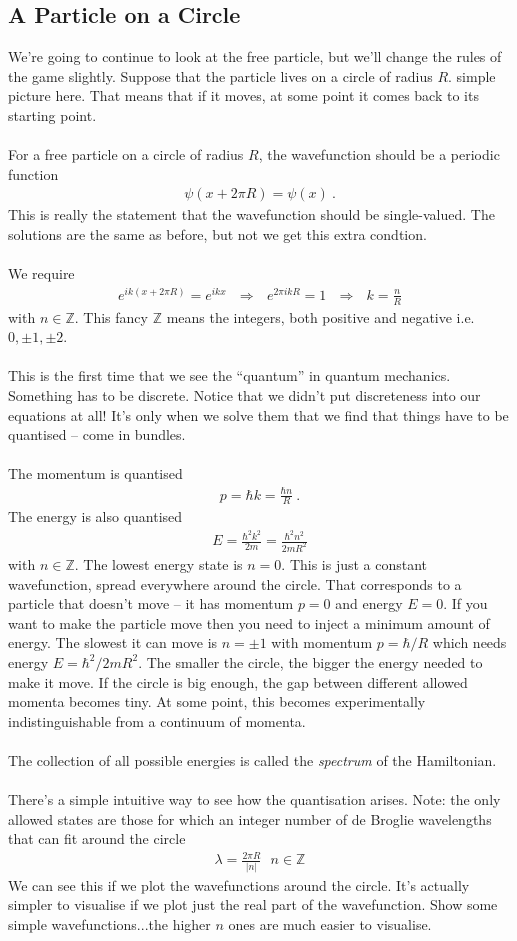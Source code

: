 \documentclass[12pt]{article}
\def\be{\begin{eqnarray}}
\def\ee{\end{eqnarray}}
\newcommand{\nn}{\nonumber}
\newcommand\para{\paragraph{}}
\newcommand{\Z}{{\mathds Z}}
\begin{document}
\subsection{A Particle on a Circle}

We're going to continue to look at the free particle, but we'll change the rules of the game slightly. Suppose that the particle lives on a circle of radius $R$. {\color{blue} simple picture here}. That means that if it moves, at some point it comes back to its starting point.  

\para
{\color{olive} For a free particle on a circle of radius $R$, the wavefunction should be a periodic function
%
\be \psi(x+ 2\pi R) = \psi(x)\ .\nn\ee
} 
This is really the statement that the wavefunction should be single-valued. The solutions are the same as before, but not we get this extra condtion.

\para
{\color{olive} We require 
%
\be e^{ik(x+2\pi R)} = e^{ikx} \ \ \ \Longrightarrow \ \ \ e^{2\pi ikR} = 1 \ \ \ \Longrightarrow \ \ \ k = \frac{n}{R} \nn\ee
%
with $n\in \Z$.} This fancy $\Z$ means the integers, both positive and negative i.e. $0,\pm 1,\pm 2$.

\para
This is the first time that we see the ``quantum'' in quantum mechanics. Something has to be discrete. Notice that we didn't put discreteness into our equations at all! It's only when we solve them that we find that things have to be quantised -- come in bundles. 

\para
{\color{olive} The momentum is quantised
%
\be p = \hbar k = \frac{\hbar n}{R}\ .\nn\ee
%
The energy is also quantised
%
\be E = \frac{\hbar^2 k^2}{2m} = \frac{\hbar^2n^2}{2mR^2}\nn\ee
%
with $n\in \Z$.} The lowest energy state is $n=0$. This is just a constant wavefunction, spread everywhere around the circle. That corresponds to a particle that doesn't move -- it has momentum $p=0$ and energy $E=0$. If you want to make the particle move then you need to inject a minimum amount of energy. The slowest it can move is $n=\pm 1$ with  momentum $p=\hbar/R$ which needs energy $E = \hbar^2/2m R^2$. The smaller the circle, the bigger the energy needed to make it move. If the circle is big enough, the gap between different allowed momenta becomes tiny. At some point, this becomes experimentally indistinguishable from a continuum of momenta.

\para
{\color{olive} The collection of all possible energies is called the {\it spectrum} of the Hamiltonian.}


\para
There's a simple intuitive way to see how the quantisation arises. {\color{olive} Note: the only allowed states are those for which an integer number of de Broglie wavelengths that can fit around the circle
%
\be \lambda = \frac{2\pi R}{|n|} \ \ \ n\in \Z\nn\ee
}
We can see this if we plot the wavefunctions around the circle. It's actually simpler to visualise if we plot just the real part of the wavefunction. {\color{blue} Show some simple wavefunctions...the higher $n$ ones are much easier to visualise.}
\end{document}
